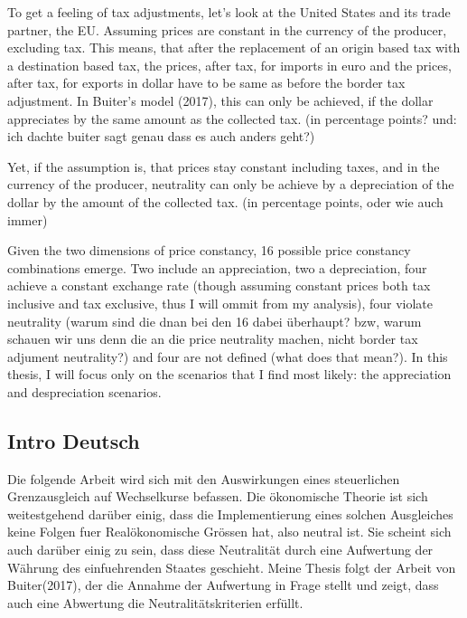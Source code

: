 To get a feeling of tax adjustments, let’s look at the United States and its trade partner, the EU. Assuming prices are constant in the currency of the producer, excluding tax. This means, that after the replacement of an origin based tax with a destination based tax, the prices, after tax, for imports in euro and the prices, after tax, for exports in dollar have to be same as before the border tax adjustment. In Buiter’s model (2017), this can only be achieved, if the dollar appreciates by the same amount as the collected tax. (in percentage points? und: ich dachte buiter sagt genau dass es auch anders geht?)

Yet, if the assumption is, that prices stay constant including taxes, and in the currency of the producer, neutrality can only be achieve by a depreciation of the dollar by the amount of the collected tax. (in percentage points, oder wie auch immer)

Given the two dimensions of price constancy, 16 possible price constancy combinations emerge. Two include an appreciation, two a depreciation, four achieve a constant exchange rate (though assuming constant prices both tax inclusive and tax exclusive, thus I will ommit from my analysis), four violate neutrality (warum sind die dnan bei den 16 dabei überhaupt? bzw, warum schauen wir uns denn die an die price neutrality machen, nicht border tax adjument neutrality?) and four are not defined (what does that mean?). In this thesis, I will focus only on the scenarios that I find most likely: the appreciation and despreciation scenarios. 

\subsection{Intro Deutsch}
Die folgende Arbeit wird sich mit den Auswirkungen eines steuerlichen Grenzausgleich auf Wechselkurse befassen. Die ökonomische Theorie ist sich weitestgehend darüber einig, dass die Implementierung eines solchen Ausgleiches keine Folgen fuer Realökonomische Grössen hat, also neutral ist. Sie scheint sich auch darüber einig zu sein, dass diese Neutralität durch eine Aufwertung der Währung des einfuehrenden Staates geschieht. 
Meine Thesis folgt der Arbeit von Buiter(2017), der die Annahme der Aufwertung in Frage stellt und zeigt, dass auch eine Abwertung die Neutralitätskriterien erfüllt. 

